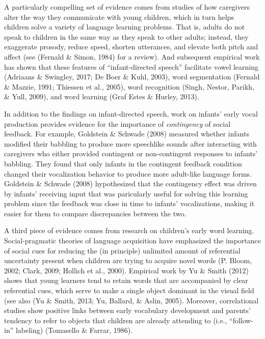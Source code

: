 \documentclass[a4paper,man,apacite,floatsintext]{apa6}
\begin{document}
A particularly compelling set of evidence comes from studies of how
caregivers alter the way they communicate with young children, which in
turn helps children solve a variety of language learning problems. That
is, adults do not speak to children in the same way as they speak to
other adults; instead, they exaggerate prosody, reduce speed, shorten
utterances, and elevate both pitch and affect (see (Fernald \& Simon,
1984) for a review). And subsequent empirical work has shown that these
features of ``infant-directed speech'' facilitate vowel learning
(Adriaans \& Swingley, 2017; De Boer \& Kuhl, 2003), word segmentation
(Fernald \& Mazzie, 1991; Thiessen et al., 2005), word recognition
(Singh, Nestor, Parikh, \& Yull, 2009), and word learning (Graf Estes \&
Hurley, 2013).

In addition to the findings on infant-directed speech, work on infants'
early vocal production provides evidence for the importance of
\emph{contingency} of social feedback. For example, Goldstein \& Schwade
(2008) measured whether infants modified their babbling to produce more
speechlike sounds after interacting with caregivers who either provided
contingent or non-contingent responses to infants' babbling. They found
that only infants in the contingent feedback condition changed their
vocalization behavior to produce more adult-like language forms.
Goldstein \& Schwade (2008) hypothesized that the contingency effect was
driven by infants' receiving input that was paricularly useful for
solving this learning problem since the feedback was close in time to
infants' vocalizations, making it easier for them to compare
discrepancies between the two.

A third piece of evidence comes from research on children's early word
learning. Social-pragmatic theories of language acquisition have
emphasized the importance of social cues for reducing the (in principle)
unlimited amount of referential uncertainty present when children are
trying to acquire novel words (P. Bloom, 2002; Clark, 2009; Hollich et
al., 2000). Empirical work by Yu \& Smith (2012) shows that young
learners tend to retain words that are accompanied by clear referential
cues, which serve to make a single object dominant in the visual field
(see also (Yu \& Smith, 2013; Yu, Ballard, \& Aslin, 2005). Moreover,
correlational studies show positive links between early vocabulary
development and parents' tendency to refer to objects that children are
already attending to (i.e., ``follow-in'' labeling) (Tomasello \&
Farrar, 1986).
\end{document}
